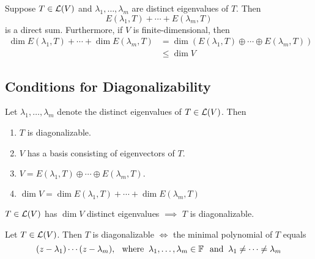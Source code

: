 \setcounter{thm}{53}
\begin{thm}
  \label{sum-of-eigenspaces-is-a-direct-sum}
  Suppose $T\in \mathcal{L} (V)$ and $\lambda_1, \dots, \lambda_m$ are distinct eigenvalues of $T$. Then
  \begin{equation}
    E(\lambda_1, T) + \cdots + E(\lambda_m, T)
  \end{equation}
  is a direct sum. Furthermore, if $V$ is finite-dimensional, then
  \begin{equation}
    \begin{aligned}
      \dim E(\lambda_1, T) + \cdots + \dim E(\lambda_m, T)
      & = \dim \left( E(\lambda_1, T)  \oplus \cdots \oplus E(\lambda_m, T) \right) \\
      & \leq \dim V
    \end{aligned}
  \end{equation}
\end{thm}

\subsection{Conditions for Diagonalizability}
\setcounter{thm}{54}
\begin{thm}
  \label{conditions-equivalent-to-diagonalizability}
  Let $\lambda_1, \dots,\lambda_m$ denote the distinct eigenvalues of $T\in \mathcal{L} (V)$. Then
  \begin{enumerate}[label=(\alph*)]
    \item $T$ is diagonalizable.
    \item $V$ has a basis consisting of eigenvectors of $T$.
    \item $V=E(\lambda_1, T) \oplus \cdots \oplus E(\lambda_m, T).$
    \item $\dim V = \dim E(\lambda_1, T) + \cdots + \dim E(\lambda_m, T)$
  \end{enumerate}
\end{thm}

\setcounter{thm}{57}
\begin{thm}
  \label{enough-eigenvalues-implies-diagonalizability}
  $T\in \mathcal{L}(V)$ has $\dim V$ distinct eigenvalues $\implies$ $T$ is diagonalizable.
\end{thm}

\setcounter{thm}{61}
\begin{thm}
  \label{necessary-and-sufficient-condition-for-diagonalizability}
  Let $T\in \mathcal{L} (V)$\footnotemark[1]. Then $T$ is diagonalizable $\iff$ the minimal polynomial of $T$ equals
  \begin{equation}
    (z-\lambda_1) \cdots (z-\lambda_m), \;\;\, \text{where}\;\; \lambda_1, \dots, \lambda_m \in \mathbb{F} \;\;\, \text{and}\;\; \lambda_1 \neq \cdots \neq \lambda_m
  \end{equation}
\end{thm}

